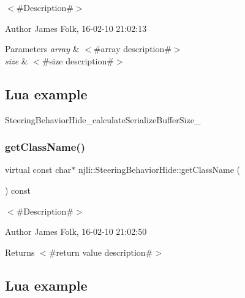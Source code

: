 $<$\#\+Description\#$>$ 

\begin{DoxyAuthor}{Author}
James Folk, 16-\/02-\/10 21\+:02\+:13
\end{DoxyAuthor}

\begin{DoxyParams}{Parameters}
{\em array} & $<$\#array description\#$>$ \\
\hline
{\em size} & $<$\#size description\#$>$\\
\hline
\end{DoxyParams}
\hypertarget{classnjli_1_1_steering_behavior_wander_ex1}{}\subsection{Lua example}\label{classnjli_1_1_steering_behavior_wander_ex1}

\begin{DoxyCodeInclude}
\end{DoxyCodeInclude}
Steering\+Behavior\+Hide\+\_\+calculate\+Serialize\+Buffer\+Size\+\_\+ \mbox{\label{classnjli_1_1_steering_behavior_hide_a219af1e998526e6e3bdd1f09aac2bc11}} 
\subsubsection{\texorpdfstring{get\+Class\+Name()}{getClassName()}}
{\footnotesize\ttfamily virtual const char$\ast$ njli\+::\+Steering\+Behavior\+Hide\+::get\+Class\+Name (\begin{DoxyParamCaption}{ }\end{DoxyParamCaption}) const\hspace{0.3cm}{\ttfamily [virtual]}}



$<$\#\+Description\#$>$ 

\begin{DoxyAuthor}{Author}
James Folk, 16-\/02-\/10 21\+:02\+:50
\end{DoxyAuthor}
\begin{DoxyReturn}{Returns}
$<$\#return value description\#$>$
\end{DoxyReturn}
\hypertarget{classnjli_1_1_steering_behavior_wander_ex1}{}\subsection{Lua example}\label{classnjli_1_1_steering_behavior_wander_ex1}

